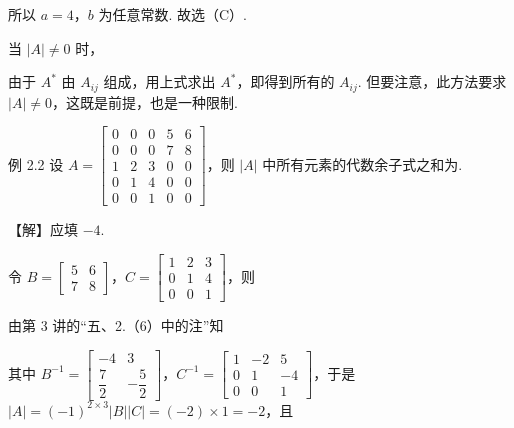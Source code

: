 所以 $a=4$，$b$ 为任意常数. 故选（C）.


当 $|A|\ne0$ 时，

由于 $A^{*}$ 由 $A_{ij}$ 组成，用上式求出 $A^{*}$，即得到所有的 $A_{ij}$. 但要注意，此方法要求 $|A|\ne0$，这既是前提，也是一种限制.

\begin{fcard}{例 2.2}
设 $A=\begin{bmatrix}0&0&0&5&6\\0&0&0&7&8\\1&2&3&0&0\\0&1&4&0&0\\0&0&1&0&0\end{bmatrix}$，则 $|A|$ 中所有元素的代数余子式之和为\underline{\hspace{2.6em}}.
\end{fcard}

【解】应填 $-4$.

令 $B=\begin{bmatrix}5&6\\7&8\end{bmatrix}$，$C=\begin{bmatrix}1&2&3\\0&1&4\\0&0&1\end{bmatrix}$，则

由第 3 讲的“五、2.（6）中的注”知

其中 $B^{-1}=\begin{bmatrix}-4&3\\ \dfrac{7}{2}&-\dfrac{5}{2}\end{bmatrix}$，$C^{-1}=\begin{bmatrix}1&-2&5\\0&1&-4\\0&0&1\end{bmatrix}$，于是 $|A|=(-1)^{2\times3}|B||C|=(-2)\times1=-2$，且

